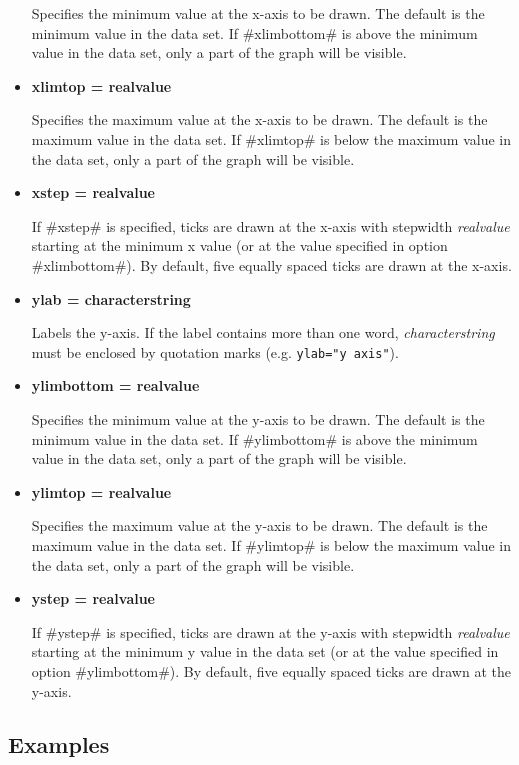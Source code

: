 \begin{itemize}
Specifies the minimum value at the x-axis to be drawn. The default
is the minimum value in the data set. If #xlimbottom# is above the
minimum value in the data set, only a part of the  graph will be
visible. \item {\bf xlimtop = realvalue}

Specifies the maximum value at the x-axis to be drawn. The default
is the maximum value in the data set. If #xlimtop# is below the
maximum value in the data set, only a part of the  graph will be
visible. \item {\bf xstep = realvalue}

If #xstep# is specified,  ticks are drawn at the x-axis with
stepwidth {\em realvalue} starting at the minimum x value (or at
the value specified in option #xlimbottom#). By default, five
equally spaced ticks are drawn at the x-axis. \item {\bf ylab =
characterstring}

Labels the y-axis. If the label contains more than one word, {\em
characterstring} must be enclosed by quotation marks (e.g.
\texttt{ylab="y axis"}). \item {\bf ylimbottom = realvalue}

Specifies the minimum value at the y-axis to be drawn. The default
is the minimum value in the data set. If #ylimbottom# is above the
minimum value in the data set, only a part of the  graph will be
visible. \item {\bf ylimtop = realvalue}

Specifies the maximum value at the y-axis to be drawn. The default
is the maximum value in the data set. If #ylimtop# is below the
maximum value in the data set, only a part of the  graph will be
visible. \item {\bf ystep = realvalue}

If #ystep# is specified,  ticks are drawn at the y-axis with
stepwidth {\em realvalue} starting at the minimum y value in the
data set (or at the value specified in option #ylimbottom#). By
default, five equally spaced ticks are drawn at the y-axis.
\end{itemize}


\subsection*{Examples}

